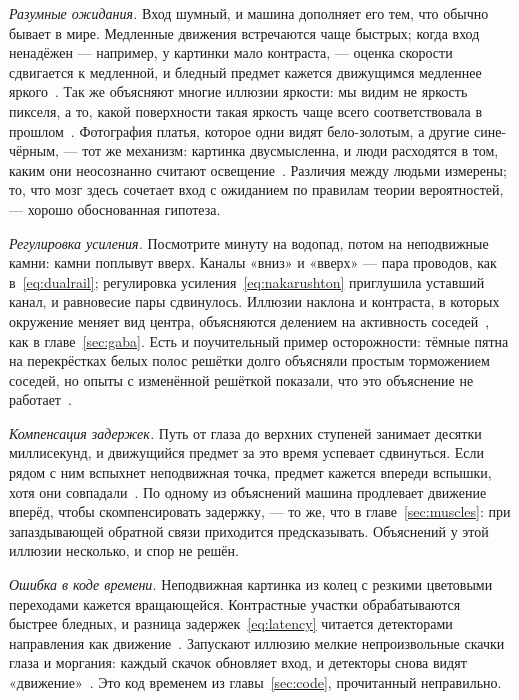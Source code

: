 \emph{Разумные ожидания.} Вход шумный, и машина дополняет его тем, что обычно бывает в мире. Медленные движения встречаются чаще быстрых; когда вход ненадёжен --- например, у картинки мало контраста, --- оценка скорости сдвигается к медленной, и бледный предмет кажется движущимся медленнее яркого~\cite{Weiss2002}. Так же объясняют многие иллюзии яркости: мы видим не яркость пикселя, а то, какой поверхности такая яркость чаще всего соответствовала в прошлом~\cite{Purves2011}. Фотография платья, которое одни видят бело-золотым, а другие сине-чёрным, --- тот же механизм: картинка двусмысленна, и люди расходятся в том, каким они неосознанно считают освещение~\cite{LaferSousa2015,Wallisch2017}. Различия между людьми измерены; то, что мозг здесь сочетает вход с ожиданием по правилам теории вероятностей, --- хорошо обоснованная гипотеза.

\emph{Регулировка усиления.} Посмотрите минуту на водопад, потом на неподвижные камни: камни поплывут вверх. Каналы «вниз» и «вверх» --- пара проводов, как в~\eqref{eq:dualrail}; регулировка усиления~\eqref{eq:nakarushton} приглушила уставший канал, и равновесие пары сдвинулось. Иллюзии наклона и контраста, в которых окружение меняет вид центра, объясняются делением на активность соседей~\cite{Schwartz2009}, как в главе~\ref{sec:gaba}. Есть и поучительный пример осторожности: тёмные пятна на перекрёстках белых полос решётки долго объясняли простым торможением соседей, но опыты с изменённой решёткой показали, что это объяснение не работает~\cite{SchillerCarvey2005}.

\emph{Компенсация задержек.} Путь от глаза до верхних ступеней занимает десятки миллисекунд, и движущийся предмет за это время успевает сдвинуться. Если рядом с ним вспыхнет неподвижная точка, предмет кажется впереди вспышки, хотя они совпадали~\cite{Nijhawan1994}. По одному из объяснений машина продлевает движение вперёд, чтобы скомпенсировать задержку, --- то же, что в главе~\ref{sec:muscles}: при запаздывающей обратной связи приходится предсказывать. Объяснений у этой иллюзии несколько, и спор не решён.

\emph{Ошибка в коде времени.} Неподвижная картинка из колец с резкими цветовыми переходами кажется вращающейся. Контрастные участки обрабатываются быстрее бледных, и разница задержек~\eqref{eq:latency} читается детекторами направления как движение~\cite{Conway2005}. Запускают иллюзию мелкие непроизвольные скачки глаза и моргания: каждый скачок обновляет вход, и детекторы снова видят «движение»~\cite{OteroMillan2012}. Это код временем из главы~\ref{sec:code}, прочитанный неправильно.

